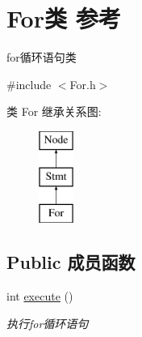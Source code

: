 \hypertarget{class_for}{}\section{For类 参考}
\label{class_for}


for循环语句类  




{\ttfamily \#include $<$For.\+h$>$}

类 For 继承关系图\+:\begin{figure}[H]
\begin{center}
\leavevmode
\includegraphics[height=3.000000cm]{class_for}
\end{center}
\end{figure}
\subsection*{Public 成员函数}
\begin{DoxyCompactItemize}
\item 
\mbox{\label{class_for_ad099d6d48c640dd5127285e59bbaba15}} 
int \hyperlink{class_for_ad099d6d48c640dd5127285e59bbaba15}{execute} ()
\begin{DoxyCompactList}\small\item\em 执行for循环语句 \end{DoxyCompactList}\end{DoxyCompactItemize}
